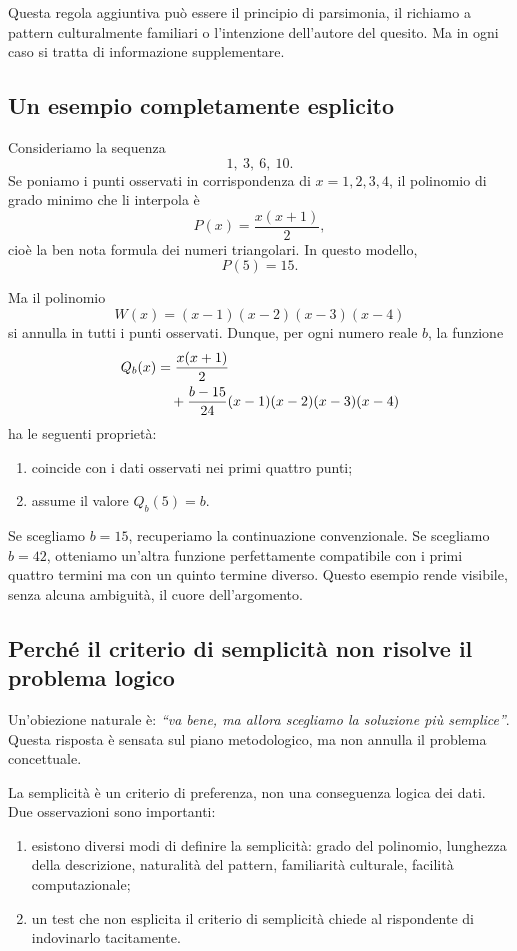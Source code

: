 \documentclass[10pt, a4paper]{article}
\theoremstyle{plain}
\theoremstyle{definition}
\theoremstyle{remark}
\begin{document}
Questa regola aggiuntiva può essere il principio di parsimonia, il richiamo a
pattern culturalmente familiari o l'intenzione dell'autore del quesito. Ma in
ogni caso si tratta di informazione supplementare.

\subsection{Un esempio completamente esplicito}

Consideriamo la sequenza
\[
1,\ 3,\ 6,\ 10.
\]
Se poniamo i punti osservati in corrispondenza di $x=1,2,3,4$, il polinomio di
grado minimo che li interpola è
\[
P(x)=\frac{x(x+1)}{2},
\]
cioè la ben nota formula dei numeri triangolari. In questo modello,
\[
P(5)=15.
\]

Ma il polinomio
\[
W(x)=(x-1)(x-2)(x-3)(x-4)
\]
si annulla in tutti i punti osservati. Dunque, per ogni numero reale $b$, la
funzione
\begin{align}
Q_b(x) &= \frac{x(x+1)}{2} \notag\\
&\quad + \frac{b-15}{24}(x-1)(x-2)(x-3)(x-4)
\label{eq:example}
\end{align}
ha le seguenti proprietà:
\begin{enumerate}[label=\arabic*.]
    \item coincide con i dati osservati nei primi quattro punti;
    \item assume il valore $Q_b(5)=b$.
\end{enumerate}

Se scegliamo $b=15$, recuperiamo la continuazione convenzionale. Se scegliamo
$b=42$, otteniamo un'altra funzione perfettamente compatibile con i primi quattro
termini ma con un quinto termine diverso. Questo esempio rende visibile,
senza alcuna ambiguità, il cuore dell'argomento.

\subsection{Perché il criterio di semplicità non risolve il problema logico}

Un'obiezione naturale è: \emph{``va bene, ma allora scegliamo la soluzione più
semplice''}. Questa risposta è sensata sul piano metodologico, ma non annulla il
problema concettuale.

La semplicità è un criterio di preferenza, non una conseguenza logica dei dati.
Due osservazioni sono importanti:
\begin{enumerate}[label=\arabic*.]
    \item esistono diversi modi di definire la semplicità: grado del polinomio,
          lunghezza della descrizione, naturalità del pattern, familiarità
          culturale, facilità computazionale;
    \item un test che non esplicita il criterio di semplicità chiede al
          rispondente di indovinarlo tacitamente.
\end{enumerate}
\end{document}
